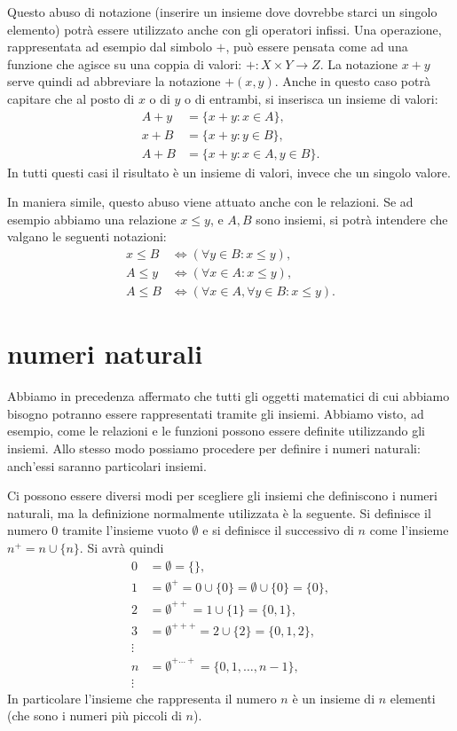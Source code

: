\documentclass[italian,a4paper,hidelinks]{scrartcl}
\begin{document}
Questo abuso di notazione
(inserire un insieme dove dovrebbe starci un singolo elemento)
potrà essere utilizzato anche con gli operatori infissi.
Una operazione, rappresentata ad esempio dal simbolo $+$, può essere pensata
come ad una funzione che agisce su una coppia di valori: $+\colon X\times Y \to Z$.
La notazione $x+y$ serve quindi ad abbreviare la notazione $+(x,y)$.
Anche in questo caso potrà capitare che al posto di $x$ o di $y$ o di entrambi,
si inserisca un insieme di valori:
\begin{align*}
   A + y &= \{x+y\colon x \in A\}, \\
   x + B &= \{x+y\colon y \in B\}, \\
   A + B &= \{x+y\colon x\in A, y \in B\}.
\end{align*}
In tutti questi casi il risultato è un insieme di valori, invece che un singolo
valore.

In maniera simile, questo abuso viene attuato anche con le relazioni.
Se ad esempio abbiamo
una relazione $x\le y$, e $A, B$ sono insiemi, si potrà intendere
che valgano le seguenti notazioni:
\begin{align*}
  x \le B &\iff (\forall y\in B\colon x\le y), \\
  A \le y &\iff (\forall x\in A\colon x \le y), \\
  A \le B &\iff (\forall x\in A, \forall y\in B\colon x\le y).
\end{align*}

\section{numeri naturali}

Abbiamo in precedenza affermato che tutti gli oggetti matematici di cui abbiamo
bisogno potranno essere rappresentati tramite gli insiemi.
Abbiamo visto, ad esempio, come le relazioni e le funzioni possono essere definite
utilizzando gli insiemi. Allo stesso modo possiamo procedere per definire i numeri
naturali: anch'essi saranno particolari insiemi.

Ci possono essere diversi modi per scegliere gli insiemi che definiscono i numeri
naturali, ma la definizione normalmente utilizzata è la seguente.
Si definisce il numero $0$ tramite l'insieme vuoto $\emptyset$ e si definisce
il successivo di $n$ come l'insieme $n^+ = n \cup \{ n \}$. Si avrà quindi
\begin{align*}
  0 &= \emptyset = \{\}, \\
  1 &= \emptyset^+ = 0 \cup \{0\} = \emptyset \cup \{0\} = \{0\}, \\
  2 &= \emptyset^{++} = 1 \cup \{1\} = \{0, 1\}, \\
  3 &= \emptyset^{+++} = 2 \cup \{2\} = \{0, 1, 2\},\\
  \vdots \\
  n &= \emptyset^{+\dots +} = \{ 0, 1, \dots, n-1\}, \\
  \vdots
\end{align*}
In particolare l'insieme che rappresenta il numero $n$ è un insieme di $n$
elementi (che sono i numeri più piccoli di $n$).
\end{document}
